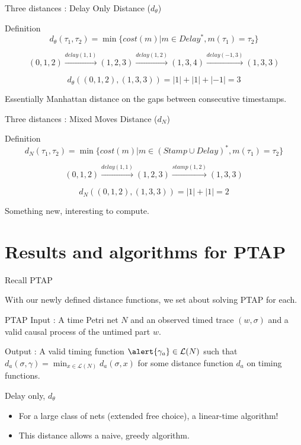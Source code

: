 \documentclass[10pt]{beamer}
\begin{document}
\begin{frame}{Three distances : Delay Only Distance ($d_\theta$)}
\begin{block}{Definition}
    	\small $$d_\theta(\tau_1, \tau_2) = \min \{cost(m) | {m \in Delay^*}, {m(\tau_1) = \tau_2}\}$$
\end{block}

	
	$$(0,1,2) \xrightarrow{delay(1,1)}(1,2,3) \xrightarrow{delay(1,2)} (1,3,4) \xrightarrow{delay(-1,3)} (1,3,3)$$
	
$$d_\theta((0,1,2), (1,3,3)) = |1| + |1| + |-1| = 3$$

\vfill 
Essentially Manhattan distance on the gaps between consecutive timestamps. 

\end{frame}
\begin{frame}{Three distances : Mixed Moves Distance ($d_N$)}
\begin{block}{Definition}
    \small	$$d_N(\tau_1, \tau_2) = \min \{cost(m) | {m \in (Stamp \cup Delay)^*}, {m(\tau_1) = \tau_2}\}$$
\end{block}
	
	
	
	$$(0,1,2) \xrightarrow{delay(1,1)}(1,2,3) \xrightarrow{stamp(1,2)} (1,3,3)$$
	
$$d_N((0,1,2), (1,3,3)) = |1| + |1|  = 2$$

\vfill 
Something new, interesting to compute. 
\end{frame}
\section{Results and algorithms for PTAP}

\begin{frame}{Recall PTAP}

With our newly defined distance functions, we set about solving PTAP for each. 
\vfill 

	\begin{block}{PTAP}
		Input : A time Petri net $N$ and an observed timed trace $(w, \sigma)$ and a valid causal process of the untimed part $w$. 
		\vfill 
		
		Output : A valid timing function $\alert{\gamma_a}
		\in \mathcal{L}(N)$ such that $d_a(\sigma, \gamma) = \min_{x \in \mathcal{L}(N)} d_a(\sigma, x)$ for some distance function $d_a$ on timing functions. 
		
	\end{block}
\end{frame}
\begin{frame}{Delay only, $d_\theta$}
    \begin{itemize}
        \item For a large class of nets (extended free choice), a linear-time algorithm! 
        \vfill 
        \item This distance allows a naive, greedy algorithm. 
    \end{itemize}
\end{frame}
\end{document}
